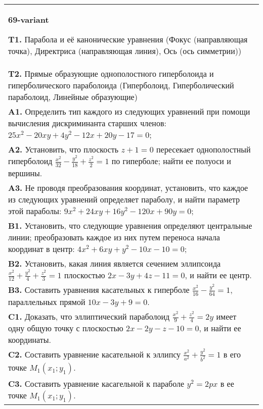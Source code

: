 \documentclass{article}
\begin{document}
\begin{tabular}{m{17cm}}
\textbf{69-variant}
\newline

\textbf{T1.} Парабола и её канонические уравнения (Фокус (направляющая точка), Директриса (направляющая линия), Ось (ось симметрии)) \\
\textbf{T2.} Прямые образующие однополостного гиперболоида и гиперболического параболоида (Гиперболоид, Гиперболический параболоид, Линейные образующие) \\
\textbf{A1.} Определить тип каждого из следующих уравнений при помощи вычисления дискриминанта старших членов: $25 x^2-20 x y+4 y^2-12 x+20 y-17=0$; \\
\textbf{A2.} Установить, что плоскость $z+1=0$ пересекает однополостный гиперболоид $\frac{x^2}{32}-\frac{y^2}{18}+\frac{z^2}{2}=1$ по гиперболе; найти ее полуоси и вершины. \\
\textbf{A3.} Не проводя преобразования координат, установить, что каждое из следующих уравнений определяет параболу, и найти параметр этой параболы: $9 x^2+24 x y+16 y^2-120 x+90 y=0$; \\
\textbf{B1.} Установить, что следующие уравнения определяют центральные линии; преобразовать каждое из них путем переноса начала координат в центр: $4 x^2+6 x y+y^2-10 x-10=0$; \\
\textbf{B2.} Установить, какая линия является сечением эллипсоида $\frac{x^2}{12}+\frac{y^2}{4}+\frac{z^2}{3}=1$ плоскостью $2 x-3 y+4 z-11=0$, и найти ее центр. \\
\textbf{B3.} Составить уравнения касательных к гиперболе $\frac{x^2}{16}-\frac{y^2}{64}=1$, параллельных прямой $10 x-3 y+9=0$. \\
\textbf{C1.} Доказать, что эллиптический параболоид $\frac{x^2}{9}+\frac{z^2}{4}=2 y$ имеет одну общую точку с плоскостью $2 x-2 y-z-10=0$, и найти ее координаты. \\
\textbf{C2.} Составить уравнение касательной к эллипсу $\frac{x^2}{a^2}+\frac{y^2}{b^2}=1$ в его точке $M_1\left(x_1 ; y_1\right)$. \\
\textbf{C3.} Составить уравнение касагельной к параболе $y^2=2 p x$ в ее точке $M_1\left(x_1 ; y_1\right)$. \\

\end{tabular}
\vspace{1cm}
\end{document}
